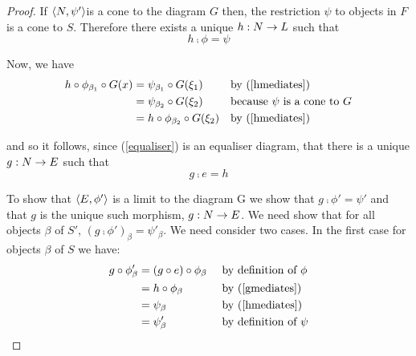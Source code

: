 \documentclass[10pt,a4paper]{scrartcl}
\begin{document}
\begin{proof}
If $\langle N,\psi'\rangle$is a cone to the diagram $G$ then, the restriction $\psi$ to objects in $F$ is a cone to  $S$. Therefore there exists a unique $h : N \rightarrow L$ such that 
\begin{equation}
\label{hmediates}
h \comp \phi = \psi
\end{equation}

\noindent
Now, we have 
\begin{align*}
h \circ \phi_{\beta_1} \circ G(x)
             & = \psi_{\beta_1} \circ G(\xi_1)         && \mbox{by (\ref{hmediates})}\\
             & = \psi_{\beta_2} \circ G(\xi_2)         && \mbox{because } \psi \mbox{ is a cone to } G \\
             & = h \circ \phi_{\beta_2} \circ G(\xi_2) && \mbox{by (\ref{hmediates}) }\\
\end{align*}

\noindent
and so it follows, since (\ref{equaliser}) is an equaliser diagram,
that there is a unique $g: N \rightarrow E$ such that 
\begin{equation}
\label{gmediates}
g \comp e = h
\end{equation}

\noindent
To show that $\langle E,\phi'\rangle$ is a limit to the diagram G we show that 
$g \comp \phi' = \psi'$ and that $g$ is the unique such morphism,
$g: N \rightarrow E$.
\noindent
We need show that for all objects $\beta$ of $S'$,  $(g \comp \phi')_\beta =\psi'_\beta$. 
We need consider two cases. In the first case for objects $\beta$ of $S$ we have:
\begin{align*}
g \circ \phi'_\beta
             & = (g \circ e) \circ \phi_\beta   &&  \mbox{ by definition of } \phi\\
             & = h \circ \phi_\beta             && \mbox{ by (\ref{gmediates})}   \\
             & = \psi_\beta                     && \mbox{ by (\ref{hmediates})}   \\
						 & = \psi'_\beta                    && \mbox{ by definition of } \psi\\
\end{align*}


\end{proof}
\end{document}
